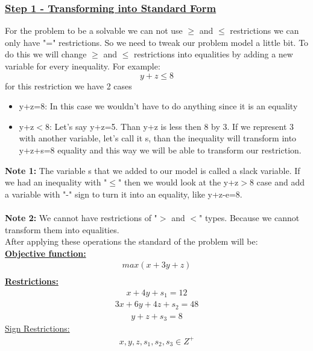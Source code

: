 \subsubsection{\underline{Step 1 - Transforming into Standard Form}}
For the problem to be a solvable we can not use $\geq$ and $\leq$ restrictions we can only have "=" restrictions. So we need to tweak our problem model a little bit. To do this we will change $\geq$ and $\leq$ restrictions into equalities by adding a new variable for every inequality. For example:\\
 \[y+z\leq 8\]\quad for this restriction we have 2 cases
 \begin{itemize}
 	\item y+z=8:
 		\subitem In this case we wouldn't have to do anything since it is an equality
 	\item y+z$<$8:
 		\subitem Let's say y+z=5. Than y+z is less then 8 by 3. If we represent 3 with another variable, let's call it s, than the inequality will transform into y+z+s=8 equality and this way we will be able to transform our restriction.
 \end{itemize}
\textbf{Note 1:} The variable s that we added to our model is called a slack variable. If we had an inequality with "$\leq$" then we would look at the y+z$>$8 case and add a variable with "-" sign to turn it into an equality, like y+z-e=8.\\
\\
\textbf{Note 2:} We cannot have restrictions of "$>$ and $<$" types. Because we cannot transform them into equalities.
\\

After applying these operations the standard of the problem will be:\\
\underline{\textbf{Objective function:}}\\
\begin{equation*}
\begin{split}
max(x+3y+z) \\
\end{split}
\end{equation*}
\underline{\textbf{Restrictions:}}\\
\begin{equation*}
\begin{split}
x+4y+s_1=12
\end{split}
\end{equation*}
\begin{equation*}
\begin{split}
3x+6y+4z+s_2=48
\end{split}
\end{equation*}
\begin{equation*}
\begin{split}
y+z+s_3=8
\end{split}
\end{equation*}
\underline{Sign Restrictions:}\\
\begin{equation*}
\begin{split}
x,y,z,s_1,s_2,s_3\in Z^+
\end{split}
\end{equation*}
